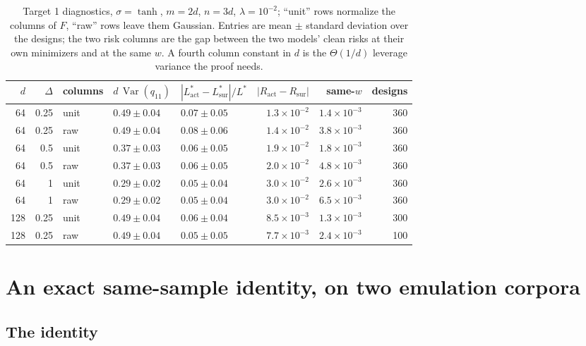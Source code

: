 \documentclass[11pt]{article}
\theoremstyle{definition}
\DeclareMathOperator{\Var}{Var}
\begin{document}
\begin{table}[t]
\centering\small
\caption{Target 1 diagnostics, $\sigma=\tanh$, $m=2d$, $n=3d$, $\lambda=10^{-2}$; ``unit'' rows
normalize the columns of $F$, ``raw'' rows leave them Gaussian. Entries are mean $\pm$ standard
deviation over the designs; the two risk columns are the gap between the two models' clean risks at
their own minimizers and at the same $w$. A fourth column constant in $d$ is the $\Theta(1/d)$
leverage variance the proof needs.}
\label{tab:t1}
{\setlength{\tabcolsep}{4.5pt}
\begin{tabular}{rrlllrrr}
\toprule
$d$ & $\Delta$ & columns & $d\,\Var(q_{11})$ & $|L^*_{\mathrm{act}}-L^*_{\mathrm{sur}}|/L^*$ &
$|R_{\mathrm{act}}-R_{\mathrm{sur}}|$ & same-$w$ & designs\\
\midrule
64 & 0.25 & unit & $0.49\pm0.04$ & $0.07\pm0.05$ & $1.3\times10^{-2}$ & $1.4\times10^{-3}$ & 360\\
64 & 0.25 & raw & $0.49\pm0.04$ & $0.08\pm0.06$ & $1.4\times10^{-2}$ & $3.8\times10^{-3}$ & 360\\
64 & 0.5 & unit & $0.37\pm0.03$ & $0.06\pm0.05$ & $1.9\times10^{-2}$ & $1.8\times10^{-3}$ & 360\\
64 & 0.5 & raw & $0.37\pm0.03$ & $0.06\pm0.05$ & $2.0\times10^{-2}$ & $4.8\times10^{-3}$ & 360\\
64 & 1 & unit & $0.29\pm0.02$ & $0.05\pm0.04$ & $3.0\times10^{-2}$ & $2.6\times10^{-3}$ & 360\\
64 & 1 & raw & $0.29\pm0.02$ & $0.05\pm0.04$ & $3.0\times10^{-2}$ & $6.5\times10^{-3}$ & 360\\
128 & 0.25 & unit & $0.49\pm0.04$ & $0.06\pm0.04$ & $8.5\times10^{-3}$ & $1.3\times10^{-3}$ & 300\\
128 & 0.25 & raw & $0.49\pm0.04$ & $0.05\pm0.05$ & $7.7\times10^{-3}$ & $2.4\times10^{-3}$ & 100\\
\bottomrule
\end{tabular}}
\end{table}

\section{An exact same-sample identity, on two emulation corpora}\label{sec:corr}

\subsection{The identity}
\end{document}
